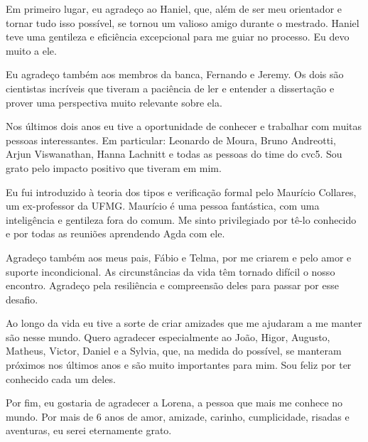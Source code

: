 Em primeiro lugar, eu agradeço ao Haniel, que, além de ser meu orientador e tornar tudo isso possível, se tornou um valioso amigo durante o mestrado. Haniel teve uma gentileza e eficiência excepcional para me guiar no processo. Eu devo muito a ele.

Eu agradeço também aos membros da banca, Fernando e Jeremy. Os dois são cientistas incríveis que tiveram a paciência de ler e entender a dissertação e prover uma perspectiva muito relevante sobre ela.

Nos últimos dois anos eu tive a oportunidade de conhecer e trabalhar com muitas pessoas interessantes. Em particular: Leonardo de Moura, Bruno Andreotti, Arjun Viswanathan, Hanna Lachnitt e todas as pessoas do time do cvc5. Sou grato pelo impacto positivo que tiveram em mim.

Eu fui introduzido à teoria dos tipos e verificação formal pelo Maurício Collares, um ex-professor da UFMG. Maurício é uma pessoa fantástica, com uma inteligência e gentileza fora do comum. Me sinto privilegiado por tê-lo conhecido e por todas as reuniões aprendendo Agda com ele.

Agradeço também aos meus pais, Fábio e Telma, por me criarem e pelo amor e suporte incondicional. As circunstâncias da vida têm tornado difícil o nosso encontro. Agradeço pela resiliência e compreensão deles para passar por esse desafio.

Ao longo da vida eu tive a sorte de criar amizades que me ajudaram a me manter são nesse mundo. Quero agradecer especialmente ao João, Higor, Augusto, Matheus, Victor, Daniel e a Sylvia, que, na medida do possível, se manteram próximos nos últimos anos e são muito importantes para mim. Sou feliz por ter conhecido cada um deles.

Por fim, eu gostaria de agradecer a Lorena, a pessoa que mais me conhece no mundo. Por mais de 6 anos de amor, amizade, carinho, cumplicidade, risadas e aventuras, eu serei eternamente grato.
